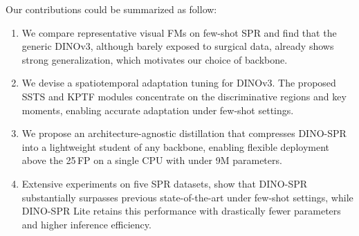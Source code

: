 Our contributions could be summarized as follow:
\begin{enumerate}
    \item We compare representative visual FMs on few-shot SPR and find that the
    generic DINOv3, although barely exposed to surgical data, already shows
    strong generalization, which motivates our choice of backbone.
    \item We devise a spatiotemporal adaptation tuning for DINOv3. The proposed SSTS and KPTF
    modules concentrate on the discriminative regions and key moments, enabling
    accurate adaptation under few-shot settings.
    \item We propose an architecture-agnostic distillation that compresses
    DINO-SPR into a lightweight student of any backbone, enabling flexible
    deployment above the 25\,FP on a single CPU with
    under 9M parameters.
    \item Extensive experiments on five SPR datasets,
    show that DINO-SPR substantially surpasses previous
    state-of-the-art under few-shot settings, while DINO-SPR Lite retains this
    performance with drastically fewer parameters and higher inference efficiency.
\end{enumerate}


